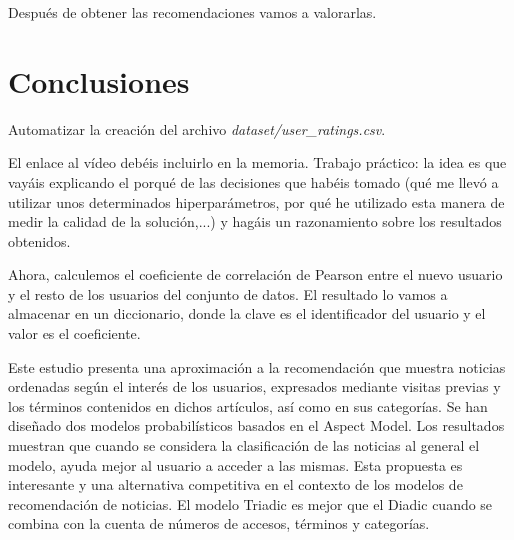 \documentclass{uimppracticas}
\begin{document}
Después de obtener las recomendaciones vamos a valorarlas. 

\newpage

\section{Conclusiones}

Automatizar la creación del archivo \textit{dataset/user\_ratings.csv}.

El enlace al vídeo debéis incluirlo en la memoria. Trabajo práctico: la idea es que vayáis explicando el porqué de las decisiones que habéis tomado (qué me llevó a utilizar unos determinados hiperparámetros, por qué he utilizado esta manera de medir la calidad de la solución,...) y hagáis un razonamiento sobre los resultados obtenidos.

Ahora, calculemos el coeficiente de correlación de Pearson entre el nuevo usuario y el resto de los usuarios del conjunto de datos. El resultado lo vamos a almacenar en un diccionario, donde la clave es el identificador del usuario y el valor es el coeficiente.


Este estudio presenta una aproximación a la recomendación que muestra
noticias ordenadas según el interés de los usuarios, expresados mediante
visitas previas y los términos contenidos en dichos artículos, así como en sus
categorías.
Se han diseñado dos modelos probabilísticos basados en el Aspect Model.
Los resultados muestran que cuando se considera la clasificación de las
noticias al general el modelo, ayuda mejor al usuario a acceder a las mismas.
Esta propuesta es interesante y una alternativa competitiva en el contexto de
los modelos de recomendación de noticias.
El modelo Triadic es mejor que el Diadic cuando se combina con la cuenta de
números de accesos, términos y categorías.


\newpage

\renewcommand{\refname}{Bibliografía}


	
\end{document}
